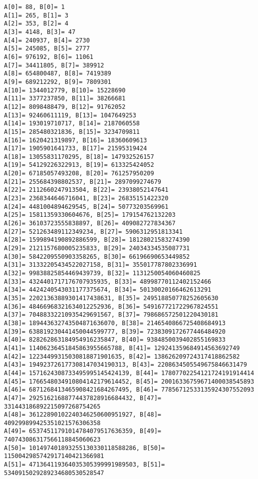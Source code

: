 \documentclass[a4paper]{article}
\begin{document}
\begin{verbatim}
A[0]= 88, B[0]= 1
A[1]= 265, B[1]= 3
A[2]= 353, B[2]= 4
A[3]= 4148, B[3]= 47
A[4]= 240937, B[4]= 2730
A[5]= 245085, B[5]= 2777
A[6]= 976192, B[6]= 11061
A[7]= 34411805, B[7]= 389912
A[8]= 654800487, B[8]= 7419389
A[9]= 689212292, B[9]= 7809301
A[10]= 1344012779, B[10]= 15228690
A[11]= 3377237850, B[11]= 38266681
A[12]= 8098488479, B[12]= 91762052
A[13]= 92460611119, B[13]= 1047649253
A[14]= 193019710717, B[14]= 2187060558
A[15]= 285480321836, B[15]= 3234709811
A[16]= 1620421319897, B[16]= 18360609613
A[17]= 1905901641733, B[17]= 21595319424
A[18]= 13055831170295, B[18]= 147932526157
A[19]= 54129226322913, B[19]= 613325424052
A[20]= 67185057493208, B[20]= 761257950209
A[21]= 255684398802537, B[21]= 2897099274679
A[22]= 2112660247913504, B[22]= 23938052147641
A[23]= 2368344646716041, B[23]= 26835151422320
A[24]= 4481004894629545, B[24]= 50773203569961
A[25]= 15811359330604676, B[25]= 179154762132203
A[26]= 36103723555838897, B[26]= 409082727834367
A[27]= 521263489112349234, B[27]= 5906312951813341
A[28]= 1599894190892886599, B[28]= 18128021583274390
A[29]= 2121157680005235833, B[29]= 24034334535087731
A[30]= 5842209550903358265, B[30]= 66196690653449852
A[31]= 31332205434522027158, B[31]= 355017787802336991
A[32]= 99838825854469439739, B[32]= 1131250054060460825
A[33]= 4324401717176707935935, B[33]= 48998770112402152466
A[34]= 4424240543031177375674, B[34]= 50130020166462613291
A[35]= 22021363889301417438631, B[35]= 249518850778252605630
A[36]= 48466968321634012252936, B[36]= 549167721722967824551
A[37]= 70488332210935429691567, B[37]= 798686572501220430181
A[38]= 189443632743504871636070, B[38]= 2146540866725408684913
A[39]= 638819230441450044599777, B[39]= 7238309172677446484920
A[40]= 828262863184954916235847, B[40]= 9384850039402855169833
A[41]= 11406236451845863955665788, B[41]= 129241359684914563692749
A[42]= 12234499315030818871901635, B[42]= 138626209724317418862582
A[43]= 194923726177308147034190313, B[43]= 2208634505549675846631479
A[44]= 1571624308733495995145424139, B[44]= 17807702254121724191914414
A[45]= 1766548034910804142179614452, B[45]= 20016336759671400038545893
A[46]= 6871268413465908421684267495, B[46]= 77856712533135924307552093
A[47]= 29251621688774437828916684432, B[47]= 331443186892215097268754265
A[48]= 36122890102240346250600951927, B[48]= 409299899425351021576306358
A[49]= 65374511791014784079517636359, B[49]= 740743086317566118845060623
A[50]= 101497401893255130330118588286, B[50]= 1150042985742917140421366981
A[51]= 471364119364035305399991989503, B[51]= 5340915029289234680530528547

\end{verbatim}
\end{document}
